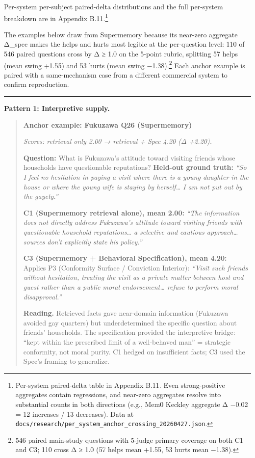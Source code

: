 Per-system per-subject paired-delta distributions and the full
per-system breakdown are in Appendix B.11.\footnote{Per-system
  paired-delta table in Appendix B.11. Even strong-positive aggregates
  contain regressions, and near-zero aggregates resolve into substantial
  counts in both directions (e.g., Mem0 Keckley aggregate Δ −0.02 = 12
  increases / 13 decreases). Data at
  \texttt{docs/research/per\_system\_anchor\_crossing\_20260427.json}.}

The examples below draw from Supermemory because its near-zero aggregate
Δ\_spec makes the helps and hurts most legible at the per-question
level: 110 of 546 paired questions cross by \textbar Δ\textbar{} ≥ 1.0
on the 5-point rubric, splitting 57 helps (mean swing +1.55) and 53
hurts (mean swing −1.38).\footnote{546 paired main-study questions
  with 5-judge primary coverage on both C1 and C3; 110 cross
  \textbar Δ\textbar{} ≥ 1.0 (57 helps mean +1.55, 53 hurts mean −1.38).} Each anchor
example is paired with a same-mechanism case from a different commercial
system to confirm reproduction.

\begin{center}\rule{0.5\linewidth}{0.5pt}\end{center}

\textbf{Pattern 1: Interpretive supply.}

\begin{quote}
\textbf{Anchor example: Fukuzawa Q26 (Supermemory)}

\emph{Scores: retrieval only 2.00 → retrieval + Spec 4.20 (Δ +2.20).}

\textbf{Question:} What is Fukuzawa's attitude toward visiting friends
whose households have questionable reputations? \textbf{Held-out ground
truth:} \emph{``So I feel no hesitation in paying a visit where there is
a young daughter in the house or where the young wife is staying by
herself\ldots{} I am not put out by the gayety.''}

\textbf{C1 (Supermemory retrieval alone), mean 2.00:} \emph{``The
information does not directly address Fukuzawa's attitude toward
visiting friends with questionable household reputations\ldots{} a
selective and cautious approach\ldots{} sources don't explicitly state
his policy.''}

\textbf{C3 (Supermemory + Behavioral Specification), mean 4.20:} Applies
P3 (Conformity Surface / Conviction Interior): \emph{``Visit such
friends without hesitation, treating the visit as a private matter
between host and guest rather than a public moral endorsement\ldots{}
refuse to perform moral disapproval.''}

\textbf{Reading.} Retrieved facts gave near-domain information (Fukuzawa
avoided gay quarters) but underdetermined the specific question about
friends' households. The specification provided the interpretive bridge:
``kept within the prescribed limit of a well-behaved man'' = strategic
conformity, not moral purity. C1 hedged on insufficient facts; C3 used
the Spec's framing to generalize.
\end{quote}

